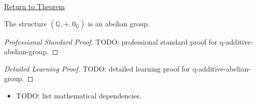 \newpage
{}
\label{prf:q-additive-abelian-group}

\begin{remark*}[Return]
\hyperref[thm:q-additive-abelian-group]{Return to Theorem}
\end{remark*}

\begin{theorem*}
The structure $(\mathbb{Q},+,0_{\mathbb{Q}})$ is an abelian group.
\end{theorem*}

\begin{proof}[Professional Standard Proof]
\LRAProofBodyStart
TODO: professional standard proof for q-additive-abelian-group.
\end{proof}

\begin{proof}[Detailed Learning Proof]
\LRAProofBodyStart
TODO: detailed learning proof for q-additive-abelian-group.
\end{proof}

\begin{remark*}
\end{remark*}

\begin{dependencies}
\begin{itemize}
  \item TODO: list mathematical dependencies.
\end{itemize}
\end{dependencies}

\clearpage
